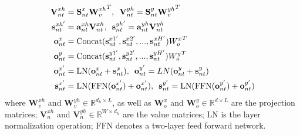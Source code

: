 \documentclass[review]{elsarticle}
\begin{document}
\begin{equation}
	\label{eq:bs3}
	\centering
	\begin{aligned}
		\textbf{V}_{nt}^{xh} &= \textbf{S}_{nt}^{x}{\textbf{W}_v^{xh}}^T, \,\,\, \textbf{V}_{nt}^{yh} = \textbf{S}_{nt}^y{\textbf{W}_v^{yh}}^T\\
		\textbf{s}_{nt}^{xh'} &= \textbf{a}_{nt}^{xh} \textbf{V}_{nt}^{xh}, \,\,\, 
		\textbf{s}_{nt}^{yh'} = \textbf{a}_{nt}^{yh} \textbf{V}_{nt}^{yh} \\
		\textbf{o}_{nt}^{x} &= \textrm{Concat}(\textbf{s}_{nt}^{x1'}  , \textbf{s}_{nt}^{x2'}  ,..., \textbf{s}_{nt}^{xH'}){W_{o}^x}^T\\
		\textbf{o}_{nt}^{y} &= \textrm{Concat}(\textbf{s}_{nt}^{y1'}, \textbf{s}_{nt}^{y2'}  ,..., \textbf{s}_{nt}^{yH'}){W_{o}^y}^T\\
		\textbf{o}_{nt}^{x'} &= \textrm{LN}(\textbf{o}_{nt}^{x} + \textbf{s}_{nt}^{x}) , \,\,\, \textbf{o}_{nt}^{y'} = LN(\textbf{o}_{nt}^{y} +\textbf{s}_{nt}^{y})\\
		\textbf{s}_{nt}^{x'} &= \textrm{LN}(\textrm{FFN}(\textbf{o}_{nt}^{x'}) + \textbf{o}_{nt}^{x'}) , \,\,\,
		\textbf{s}_{nt}^{y'} = \textrm{LN}(\textrm{FFN}(\textbf{o}_{nt}^{y'}) + \textbf{o}_{nt}^{y'})
	\end{aligned}
\end{equation} 
where $\textbf{W}^{xh}_{v} $ and $\textbf{W}^{yh}_{v} \in \mathbb{R}^{d_h \times L}$, as well as $\textbf{W}^{x}_{o} $ and $\textbf{W}^{y}_{o} \in \mathbb{R}^{d \times L}$ are the projection matrices; $\textbf{V}^{xh}_{n}$ and $\textbf{V}^{yh}_{n} \in \mathbb{R}^{W \times d_h}$ are the value matrices; LN is the layer normalization operation; FFN denotes a two-layer feed forward network.
\end{document}
